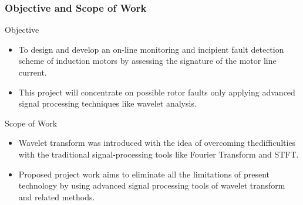 \documentclass[10pt]{beamer}
\begin{document}
\begin{frame}
\frametitle{Objective and Scope of Work}
\begin{block}{Objective}
\begin{itemize}
          \item To design and develop an on-line monitoring and incipient fault detection scheme of induction motors by assessing the signature of the motor line current.
          \item This  project  will concentrate on possible rotor faults only applying  advanced  signal processing techniques like wavelet analysis.
\end{itemize}
\end{block}

\begin{block}{Scope of Work}
\begin{itemize}
          \item Wavelet transform was introduced with the idea of overcoming thedifficulties with the traditional signal-processing tools like Fourier Transform and STFT.
	  \item Proposed project work aims to eliminate all the limitations of present technology by using advanced signal processing tools of wavelet transform and related methods.
\end{itemize}
\end{block}
\end{frame}
\end{document}
